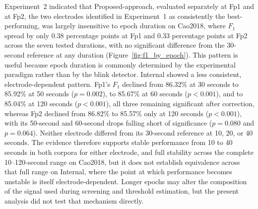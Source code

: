Experiment~2 indicated that Proposed-approach, evaluated separately at Fp1 and at Fp2, the two electrodes identified in Experiment~1 as consistently the best-performing, was largely insensitive to epoch duration on Cao2018, where $F_1$ spread by only 0.38 percentage points at Fp1 and 0.33 percentage points at Fp2 across the seven tested durations, with no significant difference from the 30-second reference at any duration (Figure~\ref{fig:f1_by_epoch}). This pattern is useful because epoch duration is commonly determined by the experimental paradigm rather than by the blink detector. Internal showed a less consistent, electrode-dependent pattern. Fp1's $F_1$ declined from 86.32\% at 30 seconds to 85.92\% at 50 seconds ($p=0.002$), to 85.67\% at 60 seconds ($p<0.001$), and to 85.04\% at 120 seconds ($p<0.001$), all three remaining significant after correction, whereas Fp2 declined from 86.82\% to 85.57\% only at 120 seconds ($p<0.001$), with its 50-second and 60-second drops falling short of significance ($p=0.080$ and $p=0.064$). Neither electrode differed from its 30-second reference at 10, 20, or 40 seconds. The evidence therefore supports stable performance from 10 to 40 seconds in both corpora for either electrode, and full stability across the complete 10--120-second range on Cao2018, but it does not establish equivalence across that full range on Internal, where the point at which performance becomes unstable is itself electrode-dependent. Longer epochs may alter the composition of the signal used during screening and threshold estimation, but the present analysis did not test that mechanism directly.
